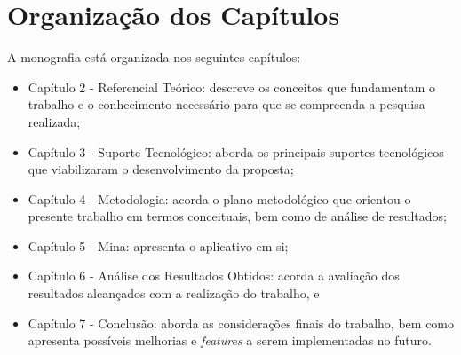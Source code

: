 \section{Organização dos Capítulos}

A monografia está organizada nos seguintes capítulos:

\begin{itemize}


        \item Capítulo 2 - Referencial Teórico: descreve os conceitos que fundamentam o trabalho e o conhecimento necessário para que se compreenda a pesquisa realizada;
        
        \item Capítulo 3 - Suporte Tecnológico: aborda os principais suportes tecnológicos que viabilizaram o desenvolvimento da proposta;
        
        \item Capítulo 4 - Metodologia: acorda o plano metodológico que orientou o presente trabalho em termos conceituais, bem como de análise de resultados;

        \item Capítulo 5 - Mina: apresenta o aplicativo em si;

        \item Capítulo 6 - Análise dos Resultados Obtidos: acorda a avaliação dos resultados alcançados com a realização do trabalho, e
        
        \item Capítulo 7 - Conclusão: aborda as considerações finais do trabalho, bem como apresenta possíveis melhorias e \emph{features} a serem implementadas no futuro.

\end{itemize}